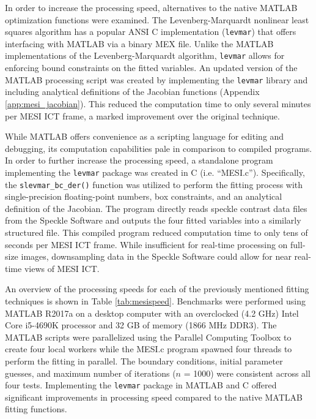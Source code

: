 In order to increase the processing speed, alternatives to the native MATLAB optimization functions were examined. The Levenberg-Marquardt nonlinear least squares algorithm has a popular ANSI C implementation (\texttt{levmar}) \cite{Lourakis:J2fCMU5i} that offers interfacing with MATLAB via a binary MEX file. Unlike the MATLAB implementations of the Levenberg-Marquardt algorithm, \texttt{levmar} allows for enforcing bound constraints on the fitted variables. An updated version of the MATLAB processing script was created by implementing the \texttt{levmar} library and including analytical definitions of the Jacobian functions (Appendix \ref{app:mesi_jacobian}). This reduced the computation time to only several minutes per MESI ICT frame, a marked improvement over the original technique.

While MATLAB offers convenience as a scripting language for editing and debugging, its computation capabilities pale in comparison to compiled programs. In order to further increase the processing speed, a standalone program implementing the \texttt{levmar} package was created in C (i.e. ``MESI.c''). Specifically, the \texttt{slevmar\_bc\_der()} function was utilized to perform the fitting process with single-precision floating-point numbers, box constraints, and an analytical definition of the Jacobian. The program directly reads speckle contrast data files from the Speckle Software and outputs the four fitted variables into a similarly structured file. This compiled program reduced computation time to only tens of seconds per MESI ICT frame. While insufficient for real-time processing on full-size images, downsampling data in the Speckle Software could allow for near real-time views of MESI ICT.

An overview of the processing speeds for each of the previously mentioned fitting techniques is shown in Table \ref{tab:mesispeed}. Benchmarks were performed using MATLAB R2017a on a desktop computer with an overclocked (4.2 GHz) Intel Core i5-4690K processor and 32 GB of memory (1866 MHz DDR3). The MATLAB scripts were parallelized using the Parallel Computing Toolbox to create four local workers while the MESI.c program spawned four threads to perform the fitting in parallel. The boundary conditions, initial parameter guesses, and maximum number of iterations ($n$ = 1000) were consistent across all four tests. Implementing the \texttt{levmar} package in MATLAB and C offered significant improvements in processing speed compared to the native MATLAB fitting functions.

